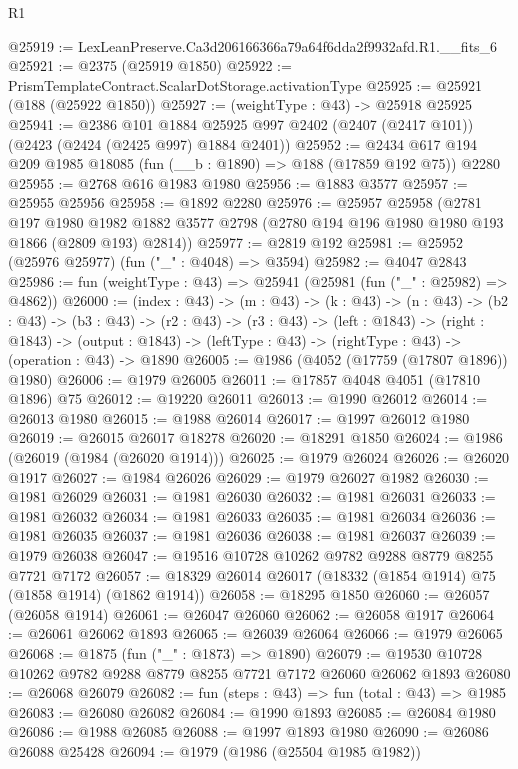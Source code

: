 \begin{lexlean}{R1}
\begin{coremodule}
@25919 := LexLeanPreserve.Ca3d206166366a79a64f6dda2f9932afd.R1.__fits_6
@25921 := @2375 (@25919 @1850)
@25922 := PrismTemplateContract.ScalarDotStorage.activationType
@25925 := @25921 (@188 (@25922 @1850))
@25927 := (weightType : @43) -> @25918 @25925
@25941 := @2386
    @101
    @1884
    @25925
    @997
    @2402
    (@2407 (@2417 @101))
    (@2423 (@2424 (@2425 @997) @1884 @2401))
@25952 := @2434 @617 @194 @209 @1985 @18085 (fun (__b : @1890) => @188 (@17859 @192 @75)) @2280
@25955 := @2768 @616 @1983 @1980
@25956 := @1883 @3577
@25957 := @25955 @25956
@25958 := @1892 @2280
@25976 := @25957
    @25958
    (@2781
      @197
      @1980
      @1982
      @1882
      @3577
      @2798
      (@2780 @194 @196 @1980 @1980 @193 @1866 (@2809 @193) @2814))
@25977 := @2819 @192
@25981 := @25952 (@25976 @25977) (fun ("_" : @4048) => @3594)
@25982 := @4047 @2843
@25986 := fun (weightType : @43) => @25941 (@25981 (fun ("_" : @25982) => @4862))
@26000 := (index : @43) ->
  (m : @43) ->
  (k : @43) ->
  (n : @43) ->
  (b2 : @43) ->
  (b3 : @43) ->
  (r2 : @43) ->
  (r3 : @43) ->
  (left : @1843) ->
  (right : @1843) ->
  (output : @1843) -> (leftType : @43) -> (rightType : @43) -> (operation : @43) -> @1890
@26005 := @1986 (@4052 (@17759 (@17807 @1896)) @1980)
@26006 := @1979 @26005
@26011 := @17857 @4048 @4051 (@17810 @1896) @75
@26012 := @19220 @26011
@26013 := @1990 @26012
@26014 := @26013 @1980
@26015 := @1988 @26014
@26017 := @1997 @26012 @1980
@26019 := @26015 @26017 @18278
@26020 := @18291 @1850
@26024 := @1986 (@26019 (@1984 (@26020 @1914)))
@26025 := @1979 @26024
@26026 := @26020 @1917
@26027 := @1984 @26026
@26029 := @1979 @26027 @1982
@26030 := @1981 @26029
@26031 := @1981 @26030
@26032 := @1981 @26031
@26033 := @1981 @26032
@26034 := @1981 @26033
@26035 := @1981 @26034
@26036 := @1981 @26035
@26037 := @1981 @26036
@26038 := @1981 @26037
@26039 := @1979 @26038
@26047 := @19516 @10728 @10262 @9782 @9288 @8779 @8255 @7721 @7172
@26057 := @18329 @26014 @26017 (@18332 (@1854 @1914) @75 (@1858 @1914) (@1862 @1914))
@26058 := @18295 @1850
@26060 := @26057 (@26058 @1914)
@26061 := @26047 @26060
@26062 := @26058 @1917
@26064 := @26061 @26062 @1893
@26065 := @26039 @26064
@26066 := @1979 @26065
@26068 := @1875 (fun ("_" : @1873) => @1890)
@26079 := @19530 @10728 @10262 @9782 @9288 @8779 @8255 @7721 @7172 @26060 @26062 @1893
@26080 := @26068 @26079
@26082 := fun (steps : @43) => fun (total : @43) => @1985
@26083 := @26080 @26082
@26084 := @1990 @1893
@26085 := @26084 @1980
@26086 := @1988 @26085
@26088 := @1997 @1893 @1980
@26090 := @26086 @26088 @25428
@26094 := @1979 (@1986 (@25504 @1985 @1982))

\end{coremodule}
\end{lexlean}
